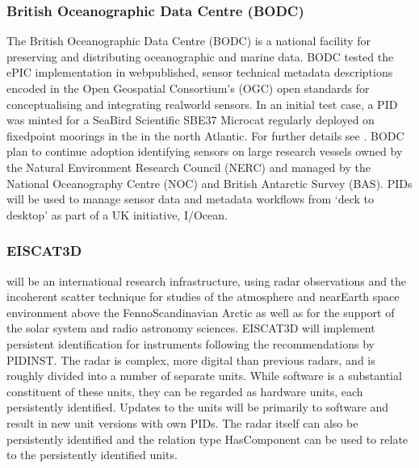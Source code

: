 \documentclass[a4paper,10pt,english]{sphinxmanual}
\begin{document}
\subsubsection{British Oceanographic Data Centre (BODC)}
\label{\detokenize{white-paper/adoption:british-oceanographic-data-centre-bodc}}
\sphinxAtStartPar
The British Oceanographic Data Centre (BODC) is a national facility
for preserving and distributing oceanographic and marine data.  BODC
tested the ePIC implementation in web\sphinxhyphen{}published, sensor technical
metadata descriptions encoded in the Open Geospatial Consortium’s
(OGC)  open standards for conceptualising and integrating
real\sphinxhyphen{}world sensors.  In an initial test case, a PID was minted for a
Sea\sphinxhyphen{}Bird Scientific SBE37 Microcat regularly deployed on fixed\sphinxhyphen{}point
moorings in the  in the north Atlantic.  For further details see
{\hyperref[\detokenize{white-paper/landing-page-encoding:landing-page-encoding-swe}]{}}.  BODC plan to continue adoption
identifying sensors on large research vessels owned by the Natural
Environment Research Council (NERC) and managed by the National
Oceanography Centre (NOC) and British Antarctic Survey (BAS).  PIDs
will be used to manage sensor data and metadata workflows from ‘deck
to desktop’ as part of a UK initiative, I/Ocean.


\subsubsection{EISCAT3D}
\label{\detokenize{white-paper/adoption:eiscat3d}}
\sphinxAtStartPar
{} will be an international research infrastructure, using
radar observations and the incoherent scatter technique for studies of
the atmosphere and near\sphinxhyphen{}Earth space environment above the
Fenno\sphinxhyphen{}Scandinavian Arctic as well as for the support of the solar
system and radio astronomy sciences.  EISCAT3D will implement
persistent identification for instruments following the
recommendations by PIDINST.  The radar is complex, more digital than
previous radars, and is roughly divided into a number of separate
units.  While software is a substantial constituent of these units,
they can be regarded as hardware units, each persistently identified.
Updates to the units will be primarily to software and result in new
unit versions with own PIDs.  The radar itself can also be
persistently identified and the relation type HasComponent can be used
to relate to the persistently identified units.
\end{document}
